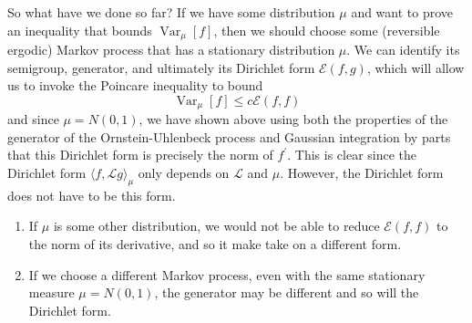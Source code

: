 \documentclass{article}
\DeclareMathOperator{\Var}{Var}
\begin{document}
  So what have we done so far? If we have some distribution $\mu$ and want to prove an inequality that bounds $\Var_\mu [f]$, then we should choose some (reversible ergodic) Markov process that has a stationary distribution $\mu$. We can identify its semigroup, generator, and ultimately its Dirichlet form $\mathcal{E}(f, g)$, which will allow us to invoke the Poincare inequality to bound 
  \[\Var_\mu [f] \leq c \mathcal{E}(f, f)\]
  and since $\mu = N(0, 1)$, we have shown above using both the properties of the generator of the Ornstein-Uhlenbeck process and Gaussian integration by parts that this Dirichlet form is precisely the norm of $f^\prime$. This is clear since the Dirichlet form $\langle f, \mathscr{L} g\rangle_\mu$ only depends on $\mathscr{L}$ and $\mu$. However, the Dirichlet form does not have to be this form. 
  \begin{enumerate}
      \item If $\mu$ is some other distribution, we would not be able to reduce $\mathcal{E}(f, f)$ to the norm of its derivative, and so it make take on a different form. 
      \item If we choose a different Markov process, even with the same stationary measure $\mu = N(0, 1)$, the generator may be different and so will the Dirichlet form. 
  \end{enumerate}
\end{document}
